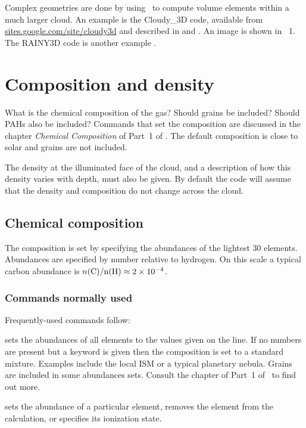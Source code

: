 \documentclass[12pt,twoside]{article}
\begin{document}
Complex geometries are done by using \Cloudy\ to compute volume elements
within a much larger cloud.
An example is the Cloudy\_3D code,
available from 
\href{http://sites.google.com/site/cloudy3d/}{sites.google.com/site/cloudy3d}
and described in \citet{MorissetCloudy3D06}
and \citet{MorissetStasinskaCloudy3D08}.
An image is shown in \Hazy\ 1.
The RAINY3D code is another example 
\citep{MoraesDiazRAINY09}.


\section{Composition and density}
\label{sec:CompositionAndDensity}

What is the chemical composition of the gas?
Should grains be included?
Should PAHs also be included?
Commands that set the composition are discussed
in the chapter \emph{Chemical Composition} of Part~1 of \Hazy.
The default
composition is close to solar and grains are not included.

The density at the illuminated face of the cloud, and a description of
how this density varies with depth, must also be given.
By default the
code will assume that the density and composition do not change across the
cloud.

\subsection{Chemical composition}

The composition is set by specifying the abundances of the lightest
30 elements.
Abundances are specified by number relative to hydrogen.
On this scale a typical carbon abundance is
$n(\rm{C}) / n(\rm{H}) \approx 2\times 10^{-4}$.

\subsubsection{Commands normally used}

Frequently-used commands follow:

 sets the abundances
\label{command:abundances}
of all elements to the values given on
the line.  If no numbers are present but a keyword is given then the
composition is set to a standard mixture.  Examples include the local ISM
or a typical planetary nebula.  Grains are included in some abundances sets.
Consult the  chapter
of Part~1 of \Hazy\ to find out more.

 sets the abundance of
\label{command:element}
a particular element, removes the element
from the calculation, or specifies its ionization state.
\end{document}
